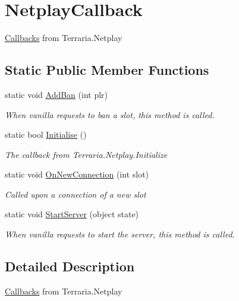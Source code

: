 \hypertarget{classOTA_1_1Callbacks_1_1NetplayCallback}{}\section{Netplay\+Callback}
\label{classOTA_1_1Callbacks_1_1NetplayCallback}


\hyperlink{namespaceOTA_1_1Callbacks}{Callbacks} from Terraria.\+Netplay  


\subsection*{Static Public Member Functions}
\begin{DoxyCompactItemize}
\item 
static void \hyperlink{classOTA_1_1Callbacks_1_1NetplayCallback_a257eb4faedacb5a9ce808043a57785f0}{Add\+Ban} (int plr)
\begin{DoxyCompactList}\small\item\em When vanilla requests to ban a slot, this method is called. \end{DoxyCompactList}\item 
static bool \hyperlink{classOTA_1_1Callbacks_1_1NetplayCallback_ae6605f542fec0440b002053126ba9187}{Initialise} ()
\begin{DoxyCompactList}\small\item\em The callback from Terraria.\+Netplay.\+Initialize \end{DoxyCompactList}\item 
static void \hyperlink{classOTA_1_1Callbacks_1_1NetplayCallback_a4e685cd7e2511b1e175cb2da88d9349e}{On\+New\+Connection} (int slot)
\begin{DoxyCompactList}\small\item\em Called upon a connection of a new slot \end{DoxyCompactList}\item 
static void \hyperlink{classOTA_1_1Callbacks_1_1NetplayCallback_ab15b2b9f09e1c3635c26e1a05c3a3d97}{Start\+Server} (object state)
\begin{DoxyCompactList}\small\item\em When vanilla requests to start the server, this method is called. \end{DoxyCompactList}\end{DoxyCompactItemize}


\subsection{Detailed Description}
\hyperlink{namespaceOTA_1_1Callbacks}{Callbacks} from Terraria.\+Netplay 



